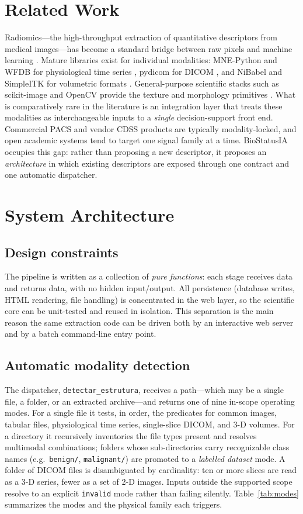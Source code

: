 \documentclass[conference]{IEEEtran}
\begin{document}
\section{Related Work}
Radiomics---the high-throughput extraction of quantitative descriptors from
medical images---has become a standard bridge between raw pixels and machine
learning \cite{gillies2016radiomics,haralick1973}. Mature libraries exist for
individual modalities: MNE-Python and WFDB for physiological time series
\cite{gramfort2013}, pydicom for DICOM \cite{mason2011pydicom}, and NiBabel and
SimpleITK for volumetric formats \cite{brett2020nibabel}. General-purpose
scientific stacks such as scikit-image and OpenCV provide the texture and
morphology primitives \cite{vanderwalt2014skimage,pedregosa2011sklearn}.
What is comparatively rare in the literature is an integration layer that treats
these modalities as interchangeable inputs to a \emph{single} decision-support
front end. Commercial PACS and vendor CDSS products are typically
modality-locked, and open academic systems tend to target one signal family at
a time. BioStatusIA occupies this gap: rather than proposing a new descriptor,
it proposes an \emph{architecture} in which existing descriptors are exposed
through one contract and one automatic dispatcher.

\section{System Architecture}
\subsection{Design constraints}
The pipeline is written as a collection of \emph{pure functions}: each stage
receives data and returns data, with no hidden input/output. All persistence
(database writes, HTML rendering, file handling) is concentrated in the web
layer, so the scientific core can be unit-tested and reused in isolation. This
separation is the main reason the same extraction code can be driven both by an
interactive web server and by a batch command-line entry point.

\subsection{Automatic modality detection}
The dispatcher, \texttt{detectar\_estrutura}, receives a path---which may be a
single file, a folder, or an extracted archive---and returns one of nine
in-scope operating modes. For a single file it tests, in order, the predicates
for common images, tabular files, physiological time series, single-slice DICOM,
and 3-D volumes. For a directory it recursively inventories the file types
present and resolves multimodal combinations; folders whose sub-directories
carry recognizable class names (e.g.\ \texttt{benign/}, \texttt{malignant/}) are
promoted to a \emph{labelled dataset} mode. A folder of DICOM files is
disambiguated by cardinality: ten or more slices are read as a 3-D series,
fewer as a set of 2-D images. Inputs outside the supported scope resolve to an
explicit \texttt{invalid} mode rather than failing silently. Table~\ref{tab:modes}
summarizes the modes and the physical family each triggers.
\end{document}
